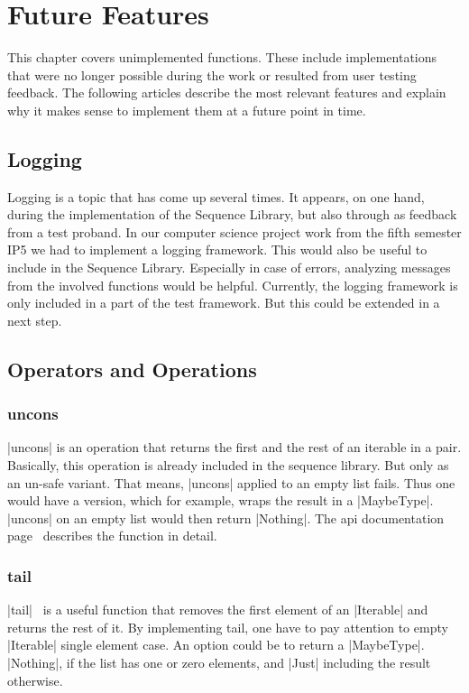 \section{Future Features}
\label{sec:Future Features}
This chapter covers unimplemented functions. These include implementations that
were no longer possible during the work or resulted from user testing feedback.
The following articles describe the most relevant features and explain why it
makes sense to implement them at a future point in time.

\subsection{Logging}
\label{sub:Logging}
Logging is a topic that has come up several times. It appears, on one hand,
during the implementation of the Sequence Library, but also through as feedback
from a test proband. In our computer science project work from the fifth
semester IP5 we had to implement a logging framework. This would also be useful
to include in the Sequence Library. Especially in case of errors, analyzing
messages from the involved functions would be helpful. Currently, the logging
framework is only included in a part of the test framework. But this could be
extended in a next step.

\subsection{Operators and Operations}
\label{sub:Operators and Operations}

\subsubsection{uncons}
\label{subsub:uncons}
|uncons| is an operation that returns the first and the rest of an iterable in a
pair. Basically, this operation is already included in the sequence library.
But only as an un-safe variant. That means, |uncons| applied to an empty list
fails. Thus one would have a version, which for example, wraps the result in a
|MaybeType|. |uncons| on an empty list would then return |Nothing|. The
api documentation page~\cite{hoogle_uncons} describes the function in detail.

\subsubsection{tail}
\label{subsub:tail}
|tail|~\cite{hoogle_tail} is a useful function that removes the first element of an |Iterable|
and returns the rest of it. By implementing tail, one have to pay attention to
empty |Iterable| single element case. An option could be to return a
|MaybeType|. |Nothing|, if the list has one or zero elements, and
|Just| including the result otherwise.

